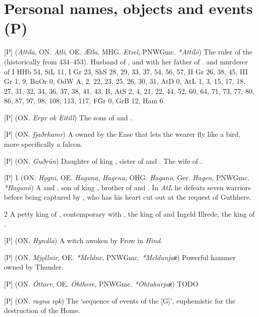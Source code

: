 \section{Personal names, objects and events (P)}
\begin{itemize}

[P] (\emph{Attila}, ON. \emph{Atli}, OE. \emph{Ætla}, MHG. \emph{Etzel}, PNWGmc. \emph{*Attilō})
  The ruler of the  (historically from 434–453). Husband of , and with her father of . and murderer of
  I HHb 54, SiL 11, I Gr 23, ShS 28, 29, 33, 37, 54, 56, 57, II Gr 26, 38, 45, III Gr 1, 9, BnOr 0, OdW A, 2, 22, 23, 25, 26, 30, 31, AtD 0, AtL 1, 3, 15, 17, 18, 27, 31, 32, 34, 36, 37, 38, 41, 43, B, AtS 2, 4, 21, 22, 44, 52, 60, 64, 71, 73, 77, 80, 86, 87, 97, 98, 108, 113, 117, FGr 0, GrB 12, Ham 6.

[P] (ON. \emph{Erpr ok Eitill})
  The sons of  and .

[P] (ON. \emph{fjaðrhamr})
  A  owned by the Ease that lets the wearer fly like a bird, more specifically a falcon.

[P] (ON. \emph{Guðrún})
  Daughter of king , sister of  and . The wife of .

[P] 1 (ON. \emph{Hǫgni}, OE. \emph{Haguna}, \emph{Hagena}, OHG. \emph{Hagano}, Ger. \emph{Hagen}, PNWGmc. \emph{*Hagunō})
  A  and , son of king , brother of  and . In \emph{AtL} he defeats seven warriors before being captured by , who has his heart cut out at the request of Guthhere.

2 A petty king of , contemporary with , the king of  and Ingeld Illrede, the  king of .

[P] (ON. \emph{Hyndla}) A witch awoken by Frow in \emph{Hind}.

[P] (ON. \emph{Mjǫllnir}, OE. \emph{*Meldne}, PNWGmc. \emph{*Meldunjaʀ})
  Powerful hammer owned by Thunder.

[P] (ON. \emph{Óttarr}, OE. \emph{Óhthere}, PNWGmc. \emph{*Ōhtaharjaʀ})
  TODO

[P] (ON. \emph{ragna rǫk})
  The ‘sequence of events of the [G]’, euphemistic for the destruction of the Home.


\end{itemize}
